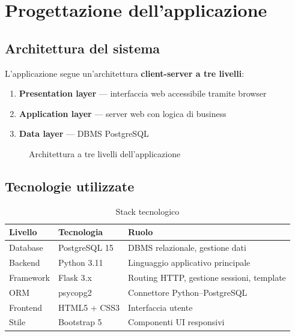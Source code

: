 \chapter{Progettazione dell'applicazione}

\section{Architettura del sistema}

L'applicazione segue un'architettura \textbf{client-server a tre livelli}:

\begin{enumerate}
  \item \textbf{Presentation layer} --- interfaccia web accessibile tramite browser
  \item \textbf{Application layer} --- server web con logica di business
  \item \textbf{Data layer} --- DBMS PostgreSQL
\end{enumerate}

\begin{figure}[H]
  \centering
  \caption{Architettura a tre livelli dell'applicazione}
  \label{fig:architettura}
\end{figure}

\section{Tecnologie utilizzate}

\begin{table}[H]
  \centering
  \caption{Stack tecnologico}
  \label{tab:stack}
  \begin{tabularx}{\textwidth}{L{3cm} L{3.5cm} L{7cm}}
    \toprule
    \textbf{Livello} & \textbf{Tecnologia} & \textbf{Ruolo} \\
    \midrule
    Database     & PostgreSQL 15   & DBMS relazionale, gestione dati \\
    Backend      & Python 3.11     & Linguaggio applicativo principale \\
    Framework    & Flask 3.x       & Routing HTTP, gestione sessioni, template \\
    ORM          & psycopg2        & Connettore Python--PostgreSQL \\
    Frontend     & HTML5 + CSS3    & Interfaccia utente \\
    Stile        & Bootstrap 5     & Componenti UI responsivi \\
    \bottomrule
  \end{tabularx}
\end{table}

